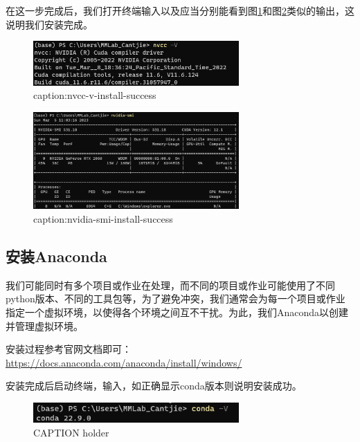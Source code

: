 在这一步完成后，我们打开终端输入以及应当分别能看到图\ref{fig:nvcc-v-install-success}和图\ref{fig:nvidia-smi-install-success}类似的输出，这说明我们安装完成。

\begin{figure}[htbp]
	\centering
	\includegraphics[width=0.7\textwidth]{figures/nvcc-v-install-success.png}
	\caption{caption:nvcc-v-install-success}
	\label{fig:nvcc-v-install-success}
\end{figure}

\begin{figure}[htbp]
	\centering
	\includegraphics[width=0.7\textwidth]{figures/nvidia-smi-install-success.png}
	\caption{caption:nvidia-smi-install-success}
	\label{fig:nvidia-smi-install-success}
\end{figure}

\subsection{安装Anaconda}

我们可能同时有多个项目或作业在处理，而不同的项目或作业可能使用了不同python版本、不同的工具包等，为了避免冲突，我们通常会为每一个项目或作业指定一个虚拟环境，以使得各个环境之间互不干扰。为此，我们Anaconda以创建并管理虚拟环境。

安装过程参考官网文档即可：
\url{https://docs.anaconda.com/anaconda/install/windows/}

安装完成后启动终端，输入，如正确显示conda版本则说明安装成功。
\begin{figure}[htbp]
	\centering
	\includegraphics[width=0.7\textwidth]{figures/conda-install-success.png}
	\caption{CAPTION holder}
	\label{LABEL holder}
\end{figure}

